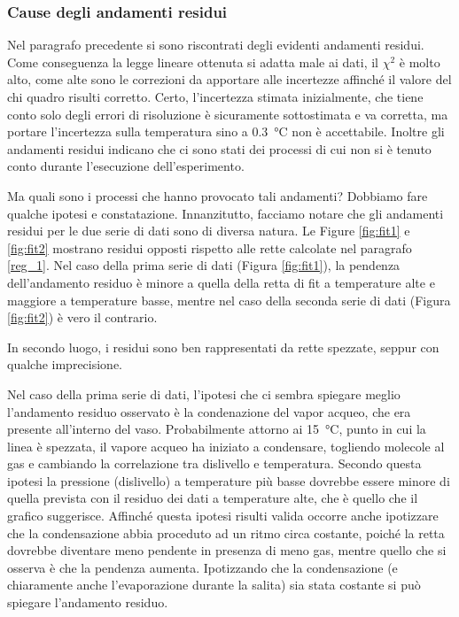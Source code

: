 \subsubsection{Cause degli andamenti residui}

Nel paragrafo precedente si sono riscontrati degli evidenti andamenti residui. Come conseguenza la legge lineare ottenuta
si adatta male ai dati, il $\chi^2$ è molto alto, come alte sono le correzioni da apportare alle incertezze affinché 
il valore del chi quadro risulti corretto. Certo, l'incertezza stimata inizialmente, che tiene conto solo degli errori di risoluzione
è sicuramente sottostimata e va corretta, ma portare l'incertezza sulla temperatura sino a \SI{0.3}{\celsius} non è accettabile.
Inoltre gli andamenti residui indicano che ci sono stati dei processi di cui non si è tenuto conto durante l'esecuzione dell'esperimento.

Ma quali sono i processi che hanno provocato tali andamenti? Dobbiamo fare qualche ipotesi e constatazione. Innanzitutto,
facciamo notare che gli andamenti residui per le due serie di dati sono di diversa natura. Le Figure \ref{fig:fit1} e
\ref{fig:fit2} mostrano residui opposti rispetto alle rette calcolate nel paragrafo \ref{reg_1}. Nel caso della prima
serie di dati (Figura \ref{fig:fit1}), la pendenza dell'andamento residuo è minore a quella della retta di fit a
temperature alte e maggiore a temperature basse, mentre nel caso della seconda serie di dati (Figura \ref{fig:fit2}) è
vero il contrario.

In secondo luogo, i residui sono ben rappresentati da rette spezzate, seppur con qualche imprecisione.

Nel caso della prima serie di dati, l'ipotesi che ci sembra spiegare meglio l'andamento residuo osservato è la condenazione
del vapor acqueo, che era presente all'interno del vaso. Probabilmente attorno ai \SI{15}{\celsius}, punto in cui la linea
è spezzata, il vapore acqueo ha iniziato a condensare, togliendo molecole al gas e cambiando la correlazione tra dislivello e
temperatura. Secondo questa ipotesi la pressione (dislivello) a temperature più basse dovrebbe essere minore di quella prevista
con il residuo dei dati a temperature alte, che è quello che il grafico suggerisce.
Affinché questa ipotesi risulti valida occorre anche ipotizzare che la condensazione abbia proceduto ad un ritmo circa costante,
poiché la retta dovrebbe diventare meno pendente in presenza di meno gas, mentre quello che si osserva è che la pendenza aumenta.
Ipotizzando che la condensazione (e chiaramente anche l'evaporazione durante la salita) sia stata costante si può spiegare 
l'andamento residuo. 

